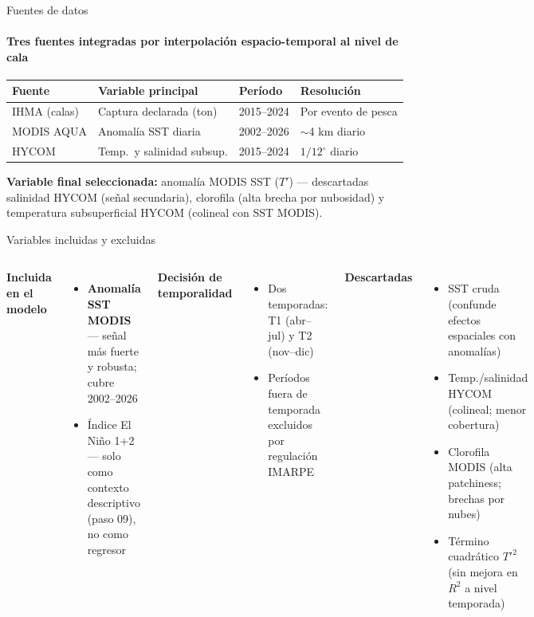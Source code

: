 \documentclass[aspectratio=169,11pt]{beamer}
\begin{document}
\begin{frame}{Fuentes de datos}
  \framesubtitle{Tres fuentes integradas por interpolación espacio-temporal al nivel de cala}
  \renewcommand{\arraystretch}{1.3}
  \begin{tabular}{p{2.8cm}p{3.5cm}p{2.2cm}p{2.8cm}}
    \toprule
    \textbf{Fuente} & \textbf{Variable principal} & \textbf{Período} & \textbf{Resolución}\\
    \midrule
    IHMA (calas) & Captura declarada (ton) & 2015--2024 & Por evento de pesca\\
    MODIS AQUA & Anomalía SST diaria & 2002--2026 & $\sim$4 km diario\\
    HYCOM & Temp.\ y salinidad subsup. & 2015--2024 & $1/12^\circ$ diario\\
    \bottomrule
  \end{tabular}
  \medskip
  {\footnotesize \textbf{Variable final seleccionada:} anomalía MODIS SST ($T'$) --- descartadas salinidad HYCOM (señal secundaria), clorofila (alta brecha por nubosidad) y temperatura subsuperficial HYCOM (colineal con SST MODIS).}
\end{frame}

\begin{frame}{Variables incluidas y excluidas}
  \begin{columns}[t]
      \textbf{\color{sgreen}Incluida en el modelo}
      \begin{itemize}
        \item \textbf{Anomalía SST MODIS} --- señal más fuerte y robusta; cubre 2002--2026
        \item Índice El Niño 1+2 --- solo como contexto descriptivo (paso 09), no como regresor
      \end{itemize}
      \smallskip
      \textbf{\color{sgreen}Decisión de temporalidad}
      \begin{itemize}
        \item Dos temporadas: T1 (abr--jul) y T2 (nov--dic)
        \item Períodos fuera de temporada excluidos por regulación IMARPE
      \end{itemize}
      \textbf{Descartadas}
      \begin{itemize}
        \item SST cruda (confunde efectos espaciales con anomalías)
        \item Temp./salinidad HYCOM (colineal; menor cobertura)
        \item Clorofila MODIS (alta patchiness; brechas por nubes)
        \item Término cuadrático $T'^{2}$ (sin mejora en $R^{2}$ a nivel temporada)
      \end{itemize}
  \end{columns}
\end{frame}
\end{document}
